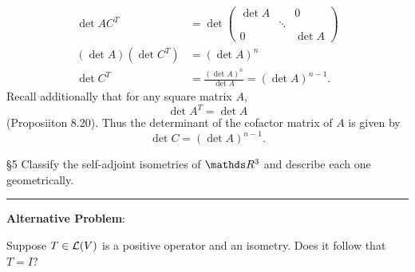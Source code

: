 \documentclass{homework}
\begin{document}
\begin{solution}
\begin{enumerate}[label=(\alph*)]
\begin{align*}
        \det{AC^T}&=\det{\begin{pmatrix} \det{A}&&0\\&\ddots&\\0&&\det{A} \end{pmatrix} }\\
        (\det{A})(\det{C^T})&=(\det{A})^n\\
        \det{C^T}&=\frac{(\det{A})^n}{\det{A}}=(\det{A})^{n-1}
      .\end{align*} Recall additionally that for any square matrix $A$, \[
        \det{A^T}=\det{A}
      \] (Proposiiton 8.20). Thus the determinant of the cofactor matrix of $A$ is given by \[
        \det{C}=(\det{A})^{n-1}
      .\] 
  \end{enumerate}
\end{solution}

\begin{problem}{\S 5}
  Classify the self-adjoint isometries of $\R^3$ and describe each one geometrically.\\
  \hrule
  \vspace{1ex}
  \textbf{Alternative Problem}:

  Suppose $T\in \mathcal{L}(V)$ is a positive operator and an isometry. Does it follow that $T=I$?
\end{problem}
\end{document}
